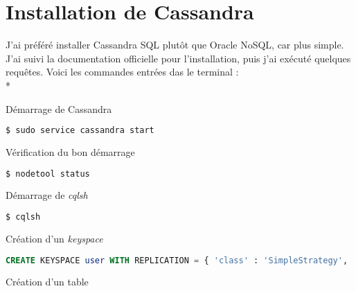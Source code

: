 \documentclass{article}
\begin{document}

\section{Installation de Cassandra}

J'ai pr\'{e}f\'{e}r\'{e} installer Cassandra SQL plut\^{o}t que Oracle NoSQL, car plus simple. J'ai suivi la documentation officielle pour l'installation, puis j'ai ex\'{e}cut\'{e} quelques requ\^{e}tes. Voici les commandes entr\'{e}es das le terminal : \\*

\begin{enumerate}
\begin{item}
D\'{e}marrage de Cassandra
\begin{tcolorbox}
\begin{lstlisting}[language=sh]
$ sudo service cassandra start
\end{lstlisting}
\end{tcolorbox}
\end{item}
\begin{item}
V\'{e}rification du bon d\'{e}marrage
\begin{tcolorbox}
\begin{lstlisting}[language=sh]
$ nodetool status
\end{lstlisting}
\end{tcolorbox}
\end{item}
\begin{item}
D\'{e}marrage de \textit{cqlsh}
\begin{tcolorbox}
\begin{lstlisting}[language=sh]
$ cqlsh
\end{lstlisting}
\end{tcolorbox}
\end{item}
\begin{item}
Cr\'{e}ation d'un \textit{keyspace}
\begin{tcolorbox}
\begin{lstlisting}[language=SQL]
CREATE KEYSPACE user WITH REPLICATION = { 'class' : 'SimpleStrategy', 'replication_factor' : 1 } ;
\end{lstlisting}
\end{tcolorbox}
\end{item}
\begin{item}
Cr\'{e}ation d'un table

\end{item}
\end{enumerate}
\end{document}
